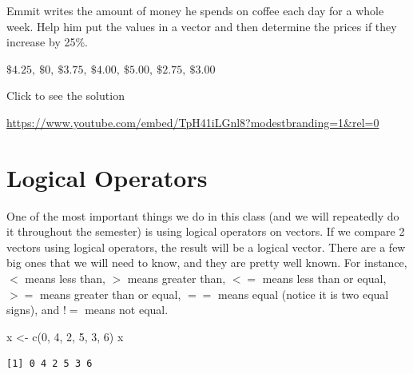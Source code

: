 \documentclass[
  letterpaper,
  DIV=11,
  numbers=noendperiod]{scrreprt}
\newenvironment{Shaded}{\begin{snugshade}}{\end{snugshade}}
\newcommand{\DecValTok}[1]{\textcolor[rgb]{0.68,0.00,0.00}{#1}}
\newcommand{\FunctionTok}[1]{\textcolor[rgb]{0.28,0.35,0.67}{#1}}
\newcommand{\NormalTok}[1]{\textcolor[rgb]{0.00,0.23,0.31}{#1}}
\newcommand{\OtherTok}[1]{\textcolor[rgb]{0.00,0.23,0.31}{#1}}
\begin{document}
\begin{tcolorbox}[enhanced jigsaw, leftrule=.75mm, arc=.35mm, coltitle=black, rightrule=.15mm, bottomrule=.15mm, toprule=.15mm, left=2mm, colbacktitle=quarto-callout-tip-color!10!white, title=\textcolor{quarto-callout-tip-color}{\faLightbulb}\hspace{0.5em}{Try it Out}, toptitle=1mm, breakable, colframe=quarto-callout-tip-color-frame, bottomtitle=1mm, titlerule=0mm, colback=white, opacityback=0, opacitybacktitle=0.6]

Emmit writes the amount of money he spends on coffee each day for a
whole week. Help him put the values in a vector and then determine the
prices if they increase by 25\%.

\(\$4.25,\ \$0,\ \$3.75,\ \$4.00,\ \$5.00,\ \$2.75,\ \$3.00\)

Click to see the solution

\url{https://www.youtube.com/embed/TpH41iLGnl8?modestbranding=1&rel=0}

\end{tcolorbox}

\section{Logical Operators}\label{logical-operators}

One of the most important things we do in this class (and we will
repeatedly do it throughout the semester) is using logical operators on
vectors. If we compare 2 vectors using logical operators, the result
will be a logical vector. There are a few big ones that we will need to
know, and they are pretty well known. For instance, \(<\) means less
than, \(>\) means greater than, \(<=\) means less than or equal, \(>=\)
means greater than or equal, \(==\) means equal (notice it is two equal
signs), and \(!=\) means not equal.

\begin{Shaded}
\begin{Highlighting}[]
\NormalTok{x }\OtherTok{\textless{}{-}} \FunctionTok{c}\NormalTok{(}\DecValTok{0}\NormalTok{, }\DecValTok{4}\NormalTok{, }\DecValTok{2}\NormalTok{, }\DecValTok{5}\NormalTok{, }\DecValTok{3}\NormalTok{, }\DecValTok{6}\NormalTok{)}
\NormalTok{x}
\end{Highlighting}
\end{Shaded}

\begin{verbatim}
[1] 0 4 2 5 3 6
\end{verbatim}
\end{document}
